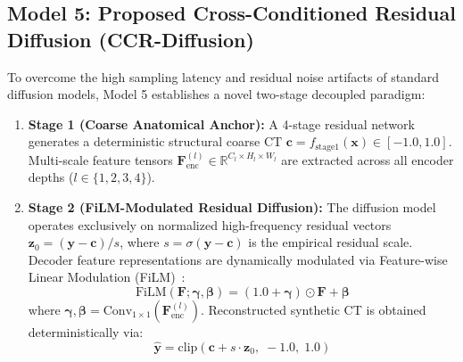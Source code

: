 \subsection{Model 5: Proposed Cross-Conditioned Residual Diffusion (CCR-Diffusion)}
To overcome the high sampling latency and residual noise artifacts of standard diffusion models, Model 5 establishes a novel two-stage decoupled paradigm:
\begin{enumerate}
    \item \textbf{Stage 1 (Coarse Anatomical Anchor):} A 4-stage residual network generates a deterministic structural coarse CT $\mathbf{c} = f_{\text{stage1}}(\mathbf{x}) \in [-1.0, 1.0]$. Multi-scale feature tensors $\mathbf{F}_{\text{enc}}^{(l)} \in \mathbb{R}^{C_l \times H_l \times W_l}$ are extracted across all encoder depths ($l \in \{1, 2, 3, 4\}$).
    \item \textbf{Stage 2 (FiLM-Modulated Residual Diffusion):} The diffusion model operates exclusively on normalized high-frequency residual vectors $\mathbf{z}_0 = (\mathbf{y} - \mathbf{c}) / s$, where $s = \sigma(\mathbf{y} - \mathbf{c})$ is the empirical residual scale. Decoder feature representations are dynamically modulated via Feature-wise Linear Modulation (FiLM)~\cite{perez2018film}:
    \begin{equation}
    \text{FiLM}(\mathbf{F}; \boldsymbol{\gamma}, \boldsymbol{\beta}) = (1.0 + \boldsymbol{\gamma}) \odot \mathbf{F} + \boldsymbol{\beta}
    \label{eq:m5_film}
    \end{equation}
    where $\boldsymbol{\gamma}, \boldsymbol{\beta} = \text{Conv}_{1 \times 1}(\mathbf{F}_{\text{enc}}^{(l)})$. Reconstructed synthetic CT is obtained deterministically via:
    \begin{equation}
    \mathbf{\hat{y}} = \text{clip}\left( \mathbf{c} + s \cdot \mathbf{z}_0, \; -1.0, \; 1.0 \right)
    \label{eq:m5_recon}
    \end{equation}
\end{enumerate}

